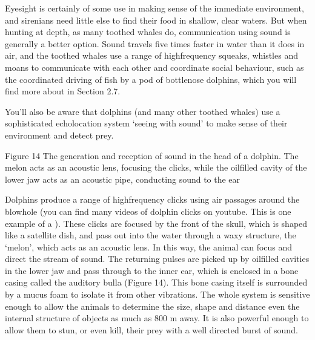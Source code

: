 \documentclass[letterpaper,10pt,english]{sphinxmanual}
\let\sphinxpxdimen\pdfpxdimen\else\newdimen\sphinxpxdimen
\begin{document}
Eyesight is certainly of some use in making sense of the immediate environment, and sirenians need little else to find their food in shallow, clear waters. But when hunting at depth, as many toothed whales do, communication using sound is generally a better option. Sound travels five times faster in water than it does in air, and the toothed whales use a range of high\sphinxhyphen{}frequency squeaks, whistles and moans to communicate with each other and coordinate social behaviour, such as the coordinated
driving of fish by a pod of bottlenose dolphins, which you will find more about in Section 2.7.

You’ll also be aware that dolphins (and many other toothed whales) use a sophisticated echolocation system \textendash{} ‘seeing with sound’ \textendash{} to make sense of their environment and detect prey.

\sphinxincludegraphics[width=677\sphinxpxdimen,height=562\sphinxpxdimen]{{s182_11_figure_12}.jpg}

Figure 14 The generation and reception of sound in the head of a dolphin. The melon acts as an acoustic lens, focusing the clicks, while the oil\sphinxhyphen{}filled cavity of the lower jaw acts as an acoustic pipe, conducting sound to the ear

Dolphins produce a range of high\sphinxhyphen{}frequency clicks using air passages around the blow\sphinxhyphen{}hole (you can find many videos of dolphin clicks on youtube. This is one example of a ). These clicks are focused by the front of the skull, which is shaped like a satellite dish, and pass out into the water through a waxy structure, the ‘melon’, which acts as an acoustic lens. In this way, the animal can
focus and direct the stream of sound. The returning pulses are picked up by oil\sphinxhyphen{}filled cavities in the lower jaw and pass through to the inner ear, which is enclosed in a bone casing called the auditory bulla (Figure 14). This bone casing itself is surrounded by a mucus foam to isolate it from other vibrations. The whole system is sensitive enough to allow the animals to determine the size, shape and distance \textendash{} even the internal structure \textendash{} of objects as much as 800 m away. It is also powerful
enough to allow them to stun, or even kill, their prey with a well directed burst of sound.
\end{document}
